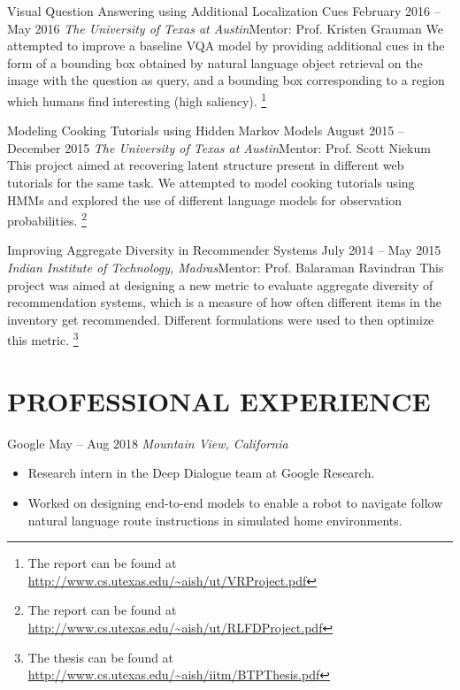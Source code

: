 \documentclass[letterpaper,10pt]{resume}
\begin{document}
{\begin{itemize}
  \credentialtwo
    {{Visual Question Answering using Additional Localization Cues}}
    {\sf February 2016 -- May 2016}
    {\it The University of Texas at Austin}{\textsf{Mentor: Prof. Kristen Grauman}}
    {}
    { 
    \small 
	We attempted to improve a baseline VQA model by providing additional cues in the form of a bounding box obtained by natural language object retrieval on the image with the question as query, and a bounding box corresponding to a region which humans find interesting (high saliency). \footnote{The report can be found at \url{http://www.cs.utexas.edu/~aish/ut/VRProject.pdf}}
    }
   \vspace{0.2cm}
 
  \credentialtwo
    {{Modeling  Cooking  Tutorials  using  Hidden  Markov  Models}}
    {\sf August 2015 -- December 2015}
    {\it The University of Texas at Austin}{\textsf{Mentor: Prof. Scott Niekum}}
    {}
    { 
    \small This project aimed at recovering latent structure present in different web tutorials for the same task. We attempted to model cooking tutorials using HMMs and explored the use of different language models for observation probabilities. \footnote{The report can be found at \url{http://www.cs.utexas.edu/~aish/ut/RLFDProject.pdf}}
    }
   \vspace{0.2cm}
   
    \credentialtwo
    {{Improving Aggregate Diversity in Recommender Systems}}
    {\sf July 2014 -- May 2015}
    {\it Indian Institute of Technology, Madras}{\textsf{Mentor: Prof. Balaraman Ravindran}}
    {}
    { 
    \small This project was aimed at designing a new metric to evaluate aggregate diversity of recommendation systems, which is a measure of how often different items in the inventory get recommended. Different formulations were used to then optimize this metric. \footnote{The thesis can be found at \url{http://www.cs.utexas.edu/~aish/iitm/BTPThesis.pdf}}
    }
   \vspace{0.2cm}

\end{itemize}

\section{PROFESSIONAL EXPERIENCE}

\begin{itemize}
   \credential
      {Google} {May -- Aug 2018}
      {\textit{Mountain View, California}} {}
      {
		\small \begin{itemize}
			\item{Research intern in the Deep Dialogue team at Google Research.}
			\item{Worked on designing end-to-end models to enable a robot to navigate follow natural language route instructions in simulated home environments.}
		\end{itemize}		      
      }
  \vspace{0.2cm}
  

\end{itemize}}
\end{document}
